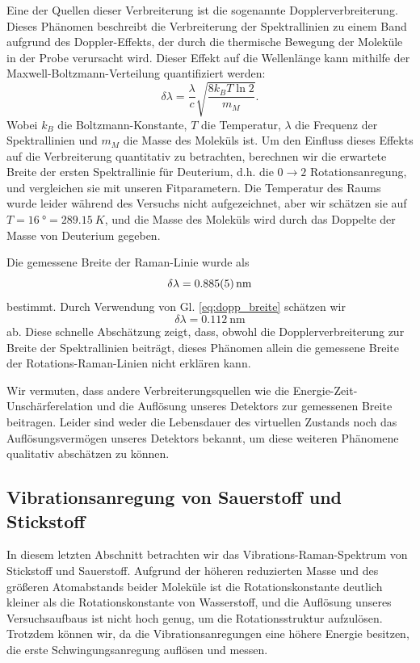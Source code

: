 \documentclass[11pt]{article}
\begin{document}
Eine der Quellen dieser Verbreiterung ist die sogenannte Dopplerverbreiterung. Dieses Phänomen beschreibt die Verbreiterung der Spektrallinien zu einem Band aufgrund des Doppler-Effekts, der durch die thermische Bewegung der Moleküle in der Probe verursacht wird. Dieser Effekt auf die Wellenlänge kann mithilfe der Maxwell-Boltzmann-Verteilung quantifiziert werden:
\begin{equation}
\label{eq:dopp_breite}
\delta \lambda = \dfrac{\lambda}{c} \sqrt{\dfrac{8k_B T \ln 2}{m_{M}}}. 
\end{equation}
Wobei $k_B$ die Boltzmann-Konstante, $T$ die Temperatur, $\lambda$ die Frequenz der Spektrallinien und $m_{M}$ die Masse des Moleküls ist. Um den Einfluss dieses Effekts auf die Verbreiterung quantitativ zu betrachten, berechnen wir die erwartete Breite der ersten Spektrallinie für Deuterium, d.h. die $0\to 2$ Rotationsanregung, und vergleichen sie mit unseren Fitparametern. Die Temperatur des Raums wurde leider während des Versuchs nicht aufgezeichnet, aber wir schätzen sie auf $T = \SI{16}{\degree} = \SI{289.15}{K}$, und die Masse des Moleküls wird durch das Doppelte der Masse von Deuterium gegeben.

Die gemessene Breite der Raman-Linie wurde als
$$\delta \lambda = \SI{0.885 \pm 0.005}{\nano\meter}$$
bestimmt. Durch Verwendung von Gl. \ref{eq:dopp_breite} schätzen wir
$$\delta \lambda =  \SI{0.112}{\nano\meter}$$
ab. Diese schnelle Abschätzung zeigt, dass, obwohl die Dopplerverbreiterung zur Breite der Spektrallinien beiträgt, dieses Phänomen allein die gemessene Breite der Rotations-Raman-Linien nicht erklären kann.

Wir vermuten, dass andere Verbreiterungsquellen wie die Energie-Zeit-Unschärferelation und die Auflösung unseres Detektors zur gemessenen Breite beitragen. Leider sind weder die Lebensdauer des virtuellen Zustands noch das Auflösungsvermögen unseres Detektors bekannt, um diese weiteren Phänomene qualitativ abschätzen zu können.

\subsection{Vibrationsanregung von Sauerstoff und Stickstoff}
In diesem letzten Abschnitt betrachten wir das Vibrations-Raman-Spektrum von Stickstoff und Sauerstoff. Aufgrund der höheren reduzierten Masse und des größeren Atomabstands beider Moleküle ist die Rotationskonstante deutlich kleiner als die Rotationskonstante von Wasserstoff, und die Auflösung unseres Versuchsaufbaus ist nicht hoch genug, um die Rotationsstruktur aufzulösen. Trotzdem können wir, da die Vibrationsanregungen eine höhere Energie besitzen, die erste Schwingungsanregung auflösen und messen.
\end{document}

